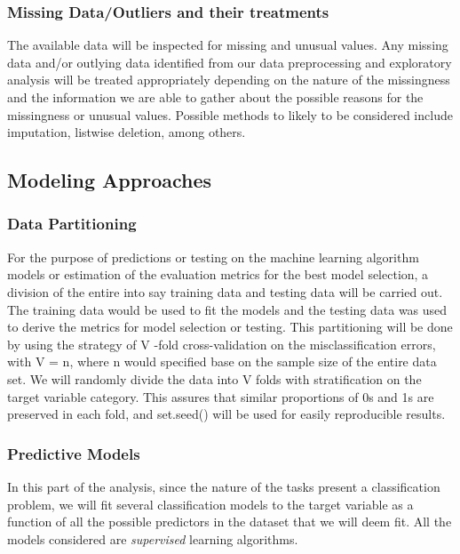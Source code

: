 \documentclass[
  10pt,
]{article}
\begin{document}
\hypertarget{missing-dataoutliers-and-their-treatments}{%
\subsubsection{Missing Data/Outliers and their treatments}\label{missing-dataoutliers-and-their-treatments}}

The available data will be inspected for missing and unusual values. Any missing data and/or outlying data identified from our data preprocessing and exploratory analysis will be treated appropriately depending on the nature of the missingness and the information we are able to gather about the possible reasons for the missingness or unusual values. Possible methods to likely to be considered include imputation, listwise deletion, among others.

\hypertarget{modeling-approaches}{%
\subsection{Modeling Approaches}\label{modeling-approaches}}

\hypertarget{data-partitioning}{%
\subsubsection{Data Partitioning}\label{data-partitioning}}

For the purpose of predictions or testing on the machine learning algorithm models or estimation of the evaluation metrics for the best model selection, a division of the entire into say training data and testing data will be carried out. The training data would be used to fit the models and the testing data was used to derive the metrics for model selection or testing. This partitioning will be done by using the strategy of V -fold cross-validation on the misclassification errors, with V = n, where n would specified base on the sample size of the entire data set. We will randomly divide the data into V folds with stratification on the target variable category. This assures that similar proportions of 0s and 1s are preserved in each fold, and set.seed() will be used for easily reproducible results.

\subsubsection{Predictive Models}

In this part of the analysis, since the nature of the tasks present a classification problem, we will fit several classification models to the target variable as a function of all the possible predictors in the dataset that we will deem fit. All the models considered are \emph{supervised} learning algorithms.
\end{document}
